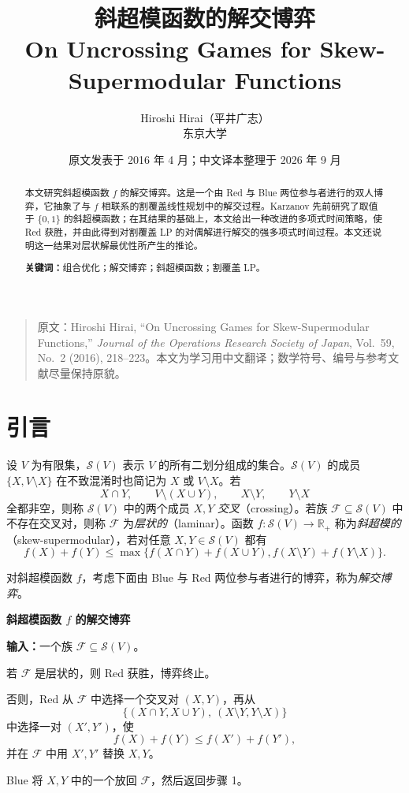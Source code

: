 \documentclass[UTF8,11pt,a4paper]{ctexart}
\title{斜超模函数的解交博弈\\\large On Uncrossing Games for Skew-Supermodular Functions}
\author{Hiroshi Hirai（平井广志）\\东京大学}
\date{原文发表于 2016 年 4 月；中文译本整理于 2026 年 9 月}
\numberwithin{equation}{section}
\newcommand{\calS}{\mathcal S}
\newcommand{\calF}{\mathcal F}
\newcommand{\R}{\mathbb R}
\begin{document}
\maketitle

\begin{quote}\small
原文：Hiroshi Hirai, ``On Uncrossing Games for Skew-Supermodular Functions,''
\emph{Journal of the Operations Research Society of Japan}, Vol.~59, No.~2
(2016), 218--223。本文为学习用中文翻译；数学符号、编号与参考文献尽量保持原貌。
\end{quote}

\begin{abstract}
本文研究斜超模函数 $f$ 的解交博弈。这是一个由 Red 与 Blue 两位参与者进行的双人博弈，它抽象了与 $f$ 相联系的割覆盖线性规划中的解交过程。Karzanov 先前研究了取值于 $\{0,1\}$ 的斜超模函数；在其结果的基础上，本文给出一种改进的多项式时间策略，使 Red 获胜，并由此得到对割覆盖 LP 的对偶解进行解交的强多项式时间过程。本文还说明这一结果对层状解最优性所产生的推论。

\noindent\textbf{关键词：}组合优化；解交博弈；斜超模函数；割覆盖 LP。
\end{abstract}

\section{引言}

设 $V$ 为有限集，$\calS(V)$ 表示 $V$ 的所有二划分组成的集合。$\calS(V)$ 的成员
$\{X,V\setminus X\}$ 在不致混淆时也简记为 $X$ 或 $V\setminus X$。若
\[
X\cap Y,\qquad V\setminus(X\cup Y),\qquad X\setminus Y,\qquad Y\setminus X
\]
全都非空，则称 $\calS(V)$ 中的两个成员 $X,Y$ \emph{交叉}（crossing）。若族
$\calF\subseteq\calS(V)$ 中不存在交叉对，则称 $\calF$ 为\emph{层状的}（laminar）。函数
$f:\calS(V)\to\R_+$ 称为\emph{斜超模的}（skew-supermodular），若对任意
$X,Y\in\calS(V)$ 都有
\[
f(X)+f(Y)\le
\max\bigl\{f(X\cap Y)+f(X\cup Y),
f(X\setminus Y)+f(Y\setminus X)\bigr\}.
\]

对斜超模函数 $f$，考虑下面由 Blue 与 Red 两位参与者进行的博弈，称为\emph{解交博弈}。

\medskip
\noindent\textbf{斜超模函数 $f$ 的解交博弈}

\noindent\textbf{输入：}一个族 $\calF\subseteq\calS(V)$。

\begin{description}[style=nextline,leftmargin=2.5em]
\item[步骤 1：]若 $\calF$ 是层状的，则 Red 获胜，博弈终止。
\item[步骤 2：]否则，Red 从 $\calF$ 中选择一个交叉对 $(X,Y)$，再从
\[
\bigl\{(X\cap Y,X\cup Y),\ (X\setminus Y,Y\setminus X)\bigr\}
\]
中选择一对 $(X',Y')$，使
\[
f(X)+f(Y)\le f(X')+f(Y'),
\]
并在 $\calF$ 中用 $X',Y'$ 替换 $X,Y$。
\item[步骤 3：]Blue 将 $X,Y$ 中的一个放回 $\calF$，然后返回步骤 1。
\end{description}
\end{document}
